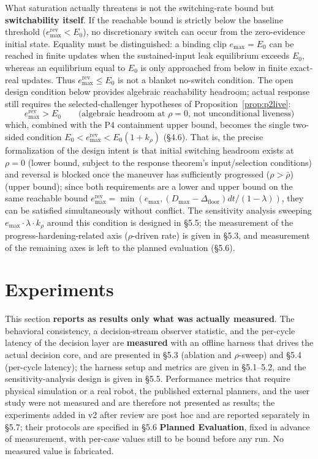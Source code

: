 \documentclass[11pt]{article}
\newcommand{\Dfloor}{\Delta_{\text{floor}}}
\newcommand{\Eremax}{e^{\text{rev}}_{\max}}
\begin{document}
What saturation actually threatens is not the switching-rate bound but \textbf{switchability itself}. If the reachable bound is strictly below the baseline threshold ($\Eremax<E_0$), no discretionary switch can occur from the zero-evidence initial state. Equality must be distinguished: a binding clip $e_{\max}=E_0$ can be reached in finite updates when the sustained-input leak equilibrium exceeds $E_0$, whereas an equilibrium equal to $E_0$ is only approached from below in finite exact-real updates. Thus $\Eremax\le E_0$ is not a blanket no-switch condition. The open design condition below provides algebraic reachability headroom; actual response still requires the selected-challenger hypotheses of Proposition~\ref{prop:p2live}:
\begin{equation}
\Eremax > E_0 \qquad \text{(algebraic headroom at } \rho=0\text{, not unconditional liveness)}
\end{equation}
which, combined with the P4 containment upper bound, becomes the single two-sided condition $E_0 < \Eremax < E_0(1+k_\rho)$ (\S4.6). That is, the precise formalization of the design intent is that initial switching headroom exists at $\rho = 0$ (lower bound, subject to the response theorem's input/selection conditions) and reversal is blocked once the maneuver has sufficiently progressed ($\rho > \bar\rho$) (upper bound); since both requirements are a lower and upper bound on the same reachable bound $\Eremax = \min(e_{\max}, (D_{\max}-\Dfloor)dt/(1-\lambda))$, they can be satisfied simultaneously without conflict. The sensitivity analysis sweeping $e_{\max}\cdot\lambda\cdot k_\rho$ around this condition is designed in \S5.5; the measurement of the progress-hardening-related axis ($\rho$-driven rate) is given in \S5.3, and measurement of the remaining axes is left to the planned evaluation (\S5.6).

\FloatBarrier
\section{Experiments}

This section \textbf{reports as results only what was actually measured}. The behavioral consistency, a decision-stream observer statistic, and the per-cycle latency of the decision layer are \textbf{measured} with an offline harness that drives the actual decision core, and are presented in \S5.3 (ablation and $\rho$-sweep) and \S5.4 (per-cycle latency); the harness setup and metrics are given in \S5.1--5.2, and the sensitivity-analysis design is given in \S5.5. Performance metrics that require physical simulation or a real robot, the published external planners, and the user study were not measured and are therefore not presented as results; the experiments added in v2 after review are post hoc and are reported separately in \S5.7; their protocols are specified in \S5.6 \textbf{Planned Evaluation}, fixed in advance of measurement, with per-case values still to be bound before any run. No measured value is fabricated.
\end{document}
